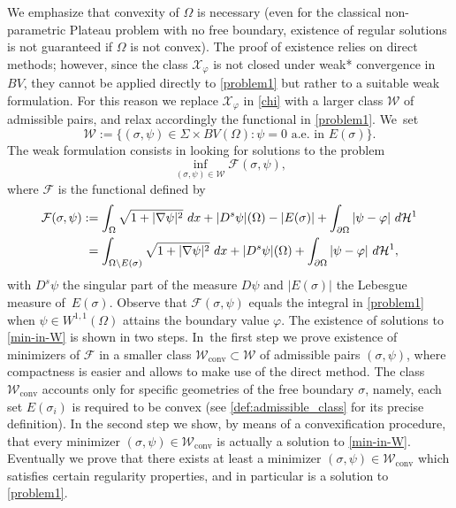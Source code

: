 \documentclass[11pt]{article}
\numberwithin{equation}{section}
\newcommand{\largercomp}{\mathcal W}
\let\curves\Sigma
\let\Om\Omega
\newcommand\admclassconv{{\mathcal W_\mathrm{conv}}}
\theoremstyle{definition}
\begin{document}
We emphasize that convexity of $\Om$ is necessary (even for the classical non-parametric Plateau problem with no free boundary, existence of regular solutions is not guaranteed if $\Omega$ is not convex).
The proof of existence relies on direct methods; however, since the class $\mathcal X_\varphi$ is not closed under weak* convergence in $BV$, they cannot be applied directly to \eqref{problem1} but
rather to a suitable weak formulation. For this reason we replace $\mathcal X_\varphi$ in \eqref{chi} with a larger class $\mathcal W$ of admissible pairs, and relax accordingly the functional in \eqref{problem1}. We~set
\begin{equation}\label{def:admissible_class_bis}
\largercomp
:=\big\{(\sigma,\psi)\in \curves \times BV(\Omega): \psi=0\text{ a.e. in }E(\sigma)\big\}.
\end{equation}
The weak formulation consists in looking for solutions to the problem
\begin{equation}\label{min-in-W}
\inf_{(\sigma,\psi)\in\mathcal W}\mathcal F(\sigma,\psi),
\end{equation}
where $\mathcal F$ is the functional defined by
\begin{align}\label{def:relaxed_functional}
\mathcal F(\sigma,\psi)
&:=\int_\Om\sqrt{1+|\nabla\psi|^2}~dx+|D^s\psi|(\Om)-|E(\sigma)|+\int_{\partial\Omega}|\psi-\varphi|~d\mathcal H^1\nonumber\\
&\hphantom{:}=\int_{\Om\setminus E(\sigma)}\sqrt{1+|\nabla\psi|^2}~dx+|D^s\psi|(\Om)+\int_{\partial\Omega}|\psi-\varphi|~d\mathcal H^1,
\end{align}
with $D^s\psi$ the singular part of the measure
$D\psi$ and $|E(\sigma)|$ the Lebesgue measure of~$E(\sigma)$.
Observe that $\mathcal F(\sigma,\psi)$
equals the integral in \eqref{problem1} when $\psi\in W^{1,1}(\Om)$ attains the boundary value $\varphi$.
The existence of solutions to \eqref{min-in-W} is shown in two steps. In~the first step we prove existence of minimizers of $\mathcal F$ in a smaller
class $\admclassconv\subset\mathcal W$ of admissible pairs $(\sigma,\psi)$,
where compactness is easier and allows to make use of the direct method.
The class $\admclassconv$
accounts only for specific geometries of the free boundary $\sigma$,
namely, each set $E(\sigma_i)$ is required to be convex (see \eqref{def:admissible_class} for its precise definition).
In the second step we show,
by means of a convexification procedure, that every minimizer $(\sigma,\psi)\in\admclassconv$ is actually a solution to \eqref{min-in-W}.
Eventually we prove that there exists at least a minimizer $(\sigma,\psi)\in\admclassconv$ which satisfies certain regularity properties, and in particular is a solution to \eqref{problem1}.
\end{document}
